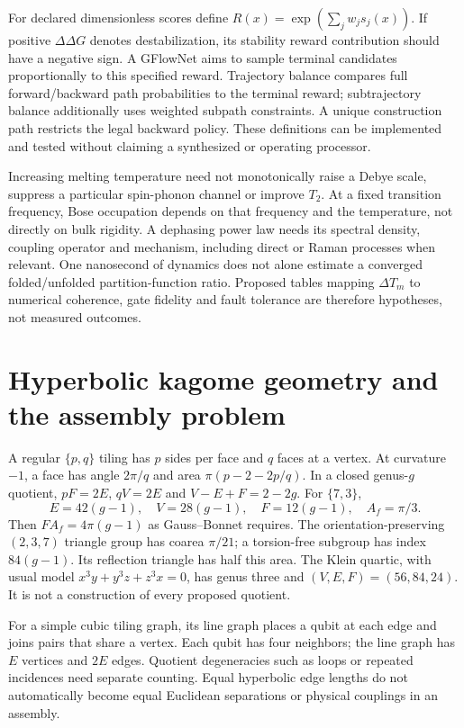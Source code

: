 \documentclass[11pt,oneside,openany]{book}
\theoremstyle{definition}\newtheorem{definition}[theorem]{Definition}
\theoremstyle{remark}\newtheorem{remark}[theorem]{Remark}
\begin{document}
For declared dimensionless scores define
$R(x)=\exp(\sum_jw_js_j(x))$. If positive $\Delta\Delta G$ denotes
destabilization, its stability reward contribution should have a negative
sign. A GFlowNet aims to sample terminal candidates proportionally to this
specified reward. Trajectory balance compares full forward/backward path
probabilities to the terminal reward; subtrajectory balance additionally
uses weighted subpath constraints. A unique construction path restricts
the legal backward policy. These definitions can be implemented and tested
without claiming a synthesized or operating processor.

Increasing melting temperature need not monotonically raise a Debye scale,
suppress a particular spin-phonon channel or improve $T_2$. At a fixed
transition frequency, Bose occupation depends on that frequency and the
temperature, not directly on bulk rigidity. A dephasing power law needs
its spectral density, coupling operator and mechanism, including direct
or Raman processes when relevant. One nanosecond of dynamics does not
alone estimate a converged folded/unfolded partition-function ratio.
Proposed tables mapping $\Delta T_m$ to numerical coherence, gate fidelity
and fault tolerance are therefore hypotheses, not measured outcomes.

\section{Hyperbolic kagome geometry and the assembly problem}
A regular $\{p,q\}$ tiling has $p$ sides per face and $q$ faces at a
vertex. At curvature $-1$, a face has angle $2\pi/q$ and area
$\pi(p-2-2p/q)$. In a closed genus-$g$ quotient,
$pF=2E$, $qV=2E$ and $V-E+F=2-2g$. For $\{7,3\}$,
\begin{equation}\label{phys:counts}
 E=42(g-1),\quad V=28(g-1),\quad F=12(g-1),\quad A_f=\pi/3.
\end{equation}
Then $FA_f=4\pi(g-1)$ as Gauss--Bonnet requires. The orientation-preserving
$(2,3,7)$ triangle group has coarea $\pi/21$; a torsion-free subgroup has
index $84(g-1)$. Its reflection triangle has half this area. The Klein
quartic, with usual model $x^3y+y^3z+z^3x=0$, has genus three and
$(V,E,F)=(56,84,24)$. It is not a construction of every proposed quotient.

For a simple cubic tiling graph, its line graph places a qubit at each
edge and joins pairs that share a vertex. Each qubit has four neighbors;
the line graph has $E$ vertices and $2E$ edges. Quotient degeneracies
such as loops or repeated incidences need separate counting. Equal
hyperbolic edge lengths do not automatically become equal Euclidean
separations or physical couplings in an assembly.
\end{document}
